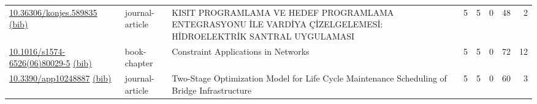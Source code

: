 {\begin{longtable}{p{5cm}lp{11cm}rrrrr}
\href{http://dx.doi.org/10.36306/konjes.589835}{10.36306/konjes.589835} \href{https://www.doi2bib.org/bib/10.36306/konjes.589835}{(bib)} & journal-article & KISIT PROGRAMLAMA VE HEDEF PROGRAMLAMA ENTEGRASYONU İLE VARDİYA ÇİZELGELEMESİ: HİDROELEKTRİK SANTRAL UYGULAMASI & 5 & 5 & 0 & 48 & 2 \\
\href{http://dx.doi.org/10.1016/s1574-6526(06)80029-5}{10.1016/s1574-6526(06)80029-5} \href{https://www.doi2bib.org/bib/10.1016/s1574-6526(06)80029-5}{(bib)} & book-chapter & Constraint Applications in Networks & 5 & 5 & 0 & 72 & 12 \\
\href{http://dx.doi.org/10.3390/app10248887}{10.3390/app10248887} \href{https://www.doi2bib.org/bib/10.3390/app10248887}{(bib)} & journal-article & Two-Stage Optimization Model for Life Cycle Maintenance Scheduling of Bridge Infrastructure & 5 & 5 & 0 & 60 & 3 \\
\end{longtable}
}

